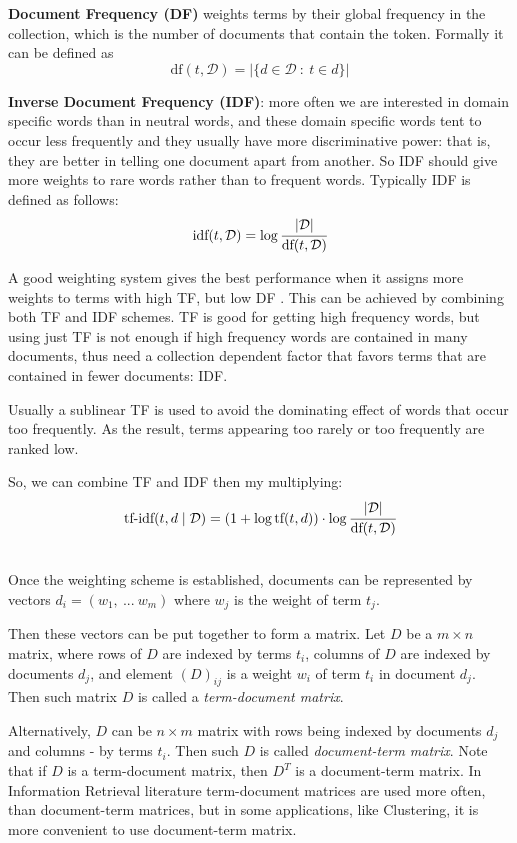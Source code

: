 \textbf{Document Frequency (DF)} weights terms by their global frequency
in the collection, which is the number of documents that contain the token.
Formally it can be defined as
$$\text{df}(t, \mathcal D) = \big| \{ d \in \mathcal D \ : \  t \in d \} \big|$$


\textbf{Inverse Document Frequency (IDF)}: more often we are interested
in domain specific words than in neutral words, and these domain specific
words tent to occur less frequently and they usually have more discriminative
power: that is, they are better in telling one document apart from another.
So IDF should give more weights to rare words rather than to frequent words.
Typically IDF is defined as follows:
$$\text{idf}(t, \mathcal D) = \log \cfrac{ |\mathcal D| }{\text{df}(t, \mathcal D)}$$



A good weighting system gives the best performance when it assigns
more weights to terms with high TF, but low DF \cite{salton1988term}.
This can be achieved by combining both TF and IDF
schemes. TF is good for getting high frequency words, but using
just TF is not enough if high frequency words are contained in
many documents, thus need a collection dependent factor that favors
terms that are contained in fewer documents: IDF.

Usually a sublinear TF is used to avoid the dominating effect of
words that occur too frequently. As the result, terms appearing
too rarely or too frequently are ranked low.

So, we can combine TF and IDF then my multiplying:
$$\text{tf-idf}(t, d \mid \mathcal D) = (1 + \log \text{tf}(t, d)) \cdot \log \cfrac{|\mathcal D|}{\text{df}(t, \mathcal D)}$$


\ \\

Once the weighting scheme is established, documents can be represented
by vectors $d_i = (w_1, \ ... \ w_m)$ where $w_j$ is the weight of term
$t_j$.

Then these vectors can be put together to form a matrix. Let $D$ be
a $m \times n$ matrix, where rows of $D$ are indexed by terms $t_i$,
columns of $D$ are indexed by documents $d_j$, and element $(D)_{ij}$
is a weight $w_i$ of term $t_i$ in document $d_j$. Then
such matrix $D$ is called a \emph{term-document matrix}.

Alternatively, $D$ can be $n \times m$ matrix with rows being indexed
by documents $d_j$ and columns - by terms $t_i$. Then such $D$ is called
\emph{document-term matrix}. Note that if $D$ is a term-document matrix,
then $D^T$ is a document-term matrix. In Information Retrieval
literature term-document matrices are used more often, than
document-term matrices, but in some applications, like Clustering,
it is more convenient to use document-term matrix.


